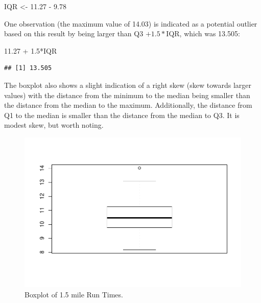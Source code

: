 \documentclass[]{book}
\newenvironment{Shaded}{\begin{snugshade}}{\end{snugshade}}
\newcommand{\KeywordTok}[1]{\textcolor[rgb]{0.13,0.29,0.53}{\textbf{{#1}}}}
\newcommand{\FloatTok}[1]{\textcolor[rgb]{0.00,0.00,0.81}{{#1}}}
\newcommand{\StringTok}[1]{\textcolor[rgb]{0.31,0.60,0.02}{{#1}}}
\newcommand{\NormalTok}[1]{{#1}}
\begin{document}
\begin{Shaded}
\begin{Highlighting}[]
\NormalTok{IQR <-}\StringTok{ }\FloatTok{11.27} \NormalTok{-}\StringTok{ }\FloatTok{9.78}
\end{Highlighting}
\end{Shaded}

One observation (the maximum value of 14.03) is indicated as a potential
outlier based on this result by being larger than Q3 \(+1.5*\)IQR, which
was 13.505:

\begin{Shaded}
\begin{Highlighting}[]
\FloatTok{11.27} \NormalTok{+}\StringTok{ }\FloatTok{1.5}\NormalTok{*IQR}
\end{Highlighting}
\end{Shaded}

\begin{verbatim}
## [1] 13.505
\end{verbatim}

The boxplot also shows a slight indication of a right skew (skew towards
larger values) with the distance from the minimum to the median being
smaller than the distance from the median to the maximum. Additionally,
the distance from Q1 to the median is smaller than the distance from the
median to Q3. It is modest skew, but worth noting.



\begin{Shaded}
\end{Shaded}

\begin{figure}[htbp]
\centering
\includegraphics{GreenwoodBanner_files/figure-latex/Figure8-1.pdf}
\caption{\label{fig:Figure8}Boxplot of 1.5 mile Run Times.}
\end{figure}
\end{document}
